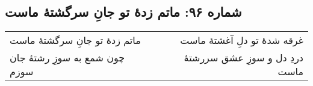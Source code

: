 \begin{center}
\section*{شماره ۹۶: ماتم زدۀ تو جانِ سرگشتۀ ماست}
\label{sec:096}
\begin{longtable}{l p{0.5cm} r}
ماتم زدهٔ تو جانِ سرگشتهٔ ماست
&&
غرقه شدهٔ تو دلِ آغشتهٔ ماست
\\
چون شمع به سوزِ رشتهٔ جان سوزم
&&
دردِ دل و سوزِ عشق سررشتهٔ ماست
\\
\end{longtable}
\end{center}
